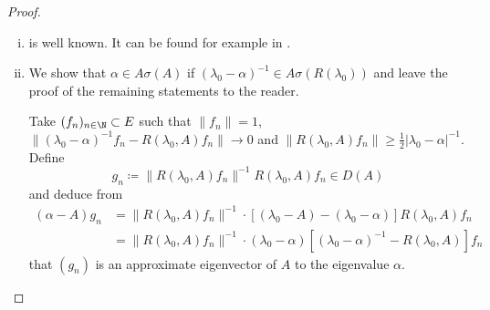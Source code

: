 \begin{proof}
\begin{enumerate}[(i), wide]
\item 
is well known. It can be found for example in \citet[VII.9.2]{dunfordschwartz:1958}.

\item 
We show that $\alpha \in A\sigma(A)$ if $(\lambda_{0}-\alpha)^{-1} \in A\sigma(R(\lambda_{0}))$ and leave the proof of the remaining statements to the reader.

Take $(f_{n})_{n \in \N} \subset E$ such that $\|f_{n}\| = 1$, $\|(\lambda_{0}-\alpha)^{-1}f_{n} - R(\lambda_{0},A)f_{n}\| \to 0$ and $\|R(\lambda_{0},A)f_{n}\| \geq \frac{1}{2}|\lambda_{0} - \alpha|^{-1}$.
Define
\[
g_{n} \coloneqq \|R(\lambda_{0},A)f_{n}\|^{-1}R(\lambda_{0},A)f_{n} \in D(A)
\]
and deduce from
\begin{align*}
(\alpha-A)g_{n} &= \|R(\lambda_{0},A)f_{n}\|^{-1} \cdot 
		[(\lambda_{0}-A) - (\lambda_{0}-\alpha)]R(\lambda_{0},A)f_{n} \\  
	&= \|R(\lambda_{0},A)f_{n}\|^{-1} \cdot 			(\lambda_{0}-\alpha)[(\lambda_{0}-\alpha)^{-1} - R(\lambda_{0},A)]f_{n}
\end{align*}
that $(g_{n})$ is an approximate eigenvector of $A$ to the eigenvalue $\alpha$.


\end{enumerate}
\end{proof}
